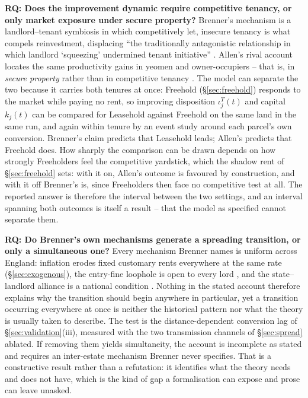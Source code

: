 \documentclass[11pt,english]{article}
\newcounter{rqctr}
\renewcommand{\therqctr}{\arabic{rqctr}}
\newcommand{\rqitem}[2]{%
  \refstepcounter{rqctr}\label{#1}%
  \medskip\noindent\textbf{RQ\therqctr: #2}}
\begin{document}
\rqitem{rq:improvement}{Does the improvement dynamic require competitive tenancy, or only market exposure under secure property?}
Brenner's mechanism is a landlord--tenant symbiosis in which competitively let, insecure tenancy is what compels reinvestment, displacing ``the traditionally antagonistic relationship in which landlord `squeezing' undermined tenant initiative'' \cite[p.65]{brenner1976agrarian}. Allen's rival account locates the same productivity gains in yeomen and owner-occupiers -- that is, in \emph{secure property} rather than in competitive tenancy \cite{allen1992enclosure}. The model can separate the two because it carries both tenures at once: Freehold (\S\ref{sec:freehold}) responds to the market while paying no rent, so improving disposition $\iota_j^{T}(t)$ and capital $k_j(t)$ can be compared for Leasehold against Freehold on the same land in the same run, and again within tenure by an event study around each parcel's own conversion. Brenner's claim predicts that Leasehold leads; Allen's predicts that Freehold does. How sharply the comparison can be drawn depends on how strongly Freeholders feel the competitive yardstick, which the shadow rent of \S\ref{sec:freehold} sets: with it on, Allen's outcome is favoured by construction, and with it off Brenner's is, since Freeholders then face no competitive test at all. The reported answer is therefore the interval between the two settings, and an interval spanning both outcomes is itself a result -- that the model as specified cannot separate them.

\rqitem{rq:spread}{Do Brenner's own mechanisms generate a spreading transition, or only a simultaneous one?}
Every mechanism Brenner names is uniform across England: inflation erodes fixed customary rents everywhere at the same rate (\S\ref{sec:exogenous}), the entry-fine loophole is open to every lord \cite[p.62]{brenner1976agrarian}, and the state--landlord alliance is a national condition \cite[p.71-72]{brenner1976agrarian}. Nothing in the stated account therefore explains why the transition should begin anywhere in particular, yet a transition occurring everywhere at once is neither the historical pattern nor what the theory is usually taken to describe. The test is the distance-dependent conversion lag of \S\ref{sec:validation}(iii), measured with the two transmission channels of \S\ref{sec:spread} ablated. If removing them yields simultaneity, the account is incomplete as stated and requires an inter-estate mechanism Brenner never specifies. That is a constructive result rather than a refutation: it identifies what the theory needs and does not have, which is the kind of gap a formalisation can expose and prose can leave unasked.
\end{document}
